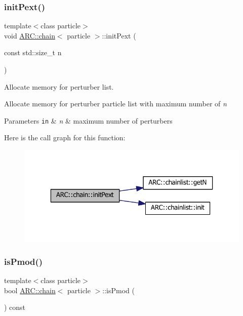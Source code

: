\subsubsection{\texorpdfstring{init\+Pext()}{initPext()}}
{\footnotesize\ttfamily template$<$class particle$>$ \\
void \hyperlink{classARC_1_1chain}{A\+R\+C\+::chain}$<$ particle $>$\+::init\+Pext (\begin{DoxyParamCaption}\item[{const std\+::size\+\_\+t}]{n }\end{DoxyParamCaption})\hspace{0.3cm}{\ttfamily [inline]}}



Allocate memory for perturber list. 

Allocate memory for perturber particle list with maximum number of {\itshape n} 
\begin{DoxyParams}[1]{Parameters}
\mbox{\tt in}  & {\em n} & maximum number of perturbers \\
\hline
\end{DoxyParams}
Here is the call graph for this function\+:
\nopagebreak
\begin{figure}[H]
\begin{center}
\leavevmode
\includegraphics[width=323pt]{classARC_1_1chain_a8e31c6a438a72d322889d0ca82fa6bf8_cgraph}
\end{center}
\end{figure}
\hypertarget{classARC_1_1chain_a9ed7067050141069bc98dccf8f7ab9d0}{}\label{classARC_1_1chain_a9ed7067050141069bc98dccf8f7ab9d0} 
\subsubsection{\texorpdfstring{is\+Pmod()}{isPmod()}}
{\footnotesize\ttfamily template$<$class particle$>$ \\
bool \hyperlink{classARC_1_1chain}{A\+R\+C\+::chain}$<$ particle $>$\+::is\+Pmod (\begin{DoxyParamCaption}{ }\end{DoxyParamCaption}) const\hspace{0.3cm}{\ttfamily [inline]}}



